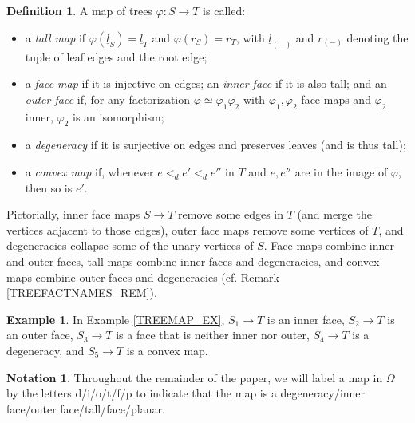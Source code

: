\documentclass[a4paper,10pt]{article}%
\numberwithin{equation}{section}
\numberwithin{figure}{section}
\theoremstyle{definition} %
\newtheorem{definition}[equation]{Definition}%
\newtheorem{example}[equation]{Example}%
\newtheorem{notation}[equation]{Notation}%
\begin{document}
\begin{definition}
        \label{TREEMAP_DEF}
        A map of trees $\varphi \colon S \to T$ is called:
        \begin{itemize}
        \item a \textit{tall map} if
                $\varphi(\underline{l}_S) = \underline{l}_T$ and $\varphi(r_S) = r_T$,
                with $\underline{l}_{(-)}$ and $r_{(-)}$ denoting the tuple of leaf edges and the root edge;
        \item a \textit{face map} if it is injective on edges;
                an \textit{inner face} if it is also tall; and
                an \textit{outer face} if, for any factorization
                $\varphi \simeq \varphi_1\varphi_2$
                with $\varphi_1,\varphi_2$ face maps
                and $\varphi_2$ inner, 
                $\varphi_2$ is an isomorphism;
        \item a \textit{degeneracy} if it is surjective on edges and preserves leaves
                (and is thus tall);
        \item a \textit{convex map} if,
        	whenever $e <_d e' <_d e''$ in $T$ 
        	and $e,e''$ are in the image of $\varphi$,
        	then so is $e'$.
        \end{itemize}
\end{definition}

Pictorially, inner face maps 
$S \to T$ remove some edges in $T$
(and merge the vertices adjacent to those edges),
outer face maps remove some vertices of $T$,
and degeneracies collapse some of the unary vertices of $S$.
Face maps combine inner and outer faces,
tall maps combine inner faces and degeneracies, 
and convex maps combine outer faces and degeneracies (cf. Remark \ref{TREEFACTNAMES_REM}).


\begin{example}
	In Example \ref{TREEMAP_EX},
	$S_1 \to T$ is an inner face,
	$S_2 \to T$ is an outer face,
	$S_3 \to T$ is a face that is neither inner nor outer,
	$S_4 \to T$ is a degeneracy,
	and $S_5 \to T$ is a convex map.
\end{example}


\begin{notation}\label{MAPLABELS_NOT}
	Throughout the remainder of the paper,
        we will label a 
        map in $\Omega$
        by the letters d/i/o/t/f/p
        to indicate that the map is
        a degeneracy/inner face/outer face/tall/face/planar.
\end{notation}
\end{document}
